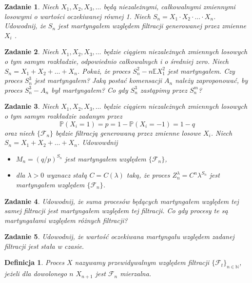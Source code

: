 \documentclass{mwart}
\newtheorem{df}{Definicja}
\newtheorem{zd}{Zadanie}
\begin{document}
\begin{zd}
Niech $X_1, X_2, X_3, \dots$ będą niezależnymi, całkowalnymi zmiennymi losowymi o wartości oczekiwanej równej 1. Niech $S_n = X_1\cdot X_2\cdot \dots \cdot X_n$. Udowodnij, że $S_n$ jest martyngałem względem filtracji generowanej przez zmienne $X_i$ .
\end{zd}

\begin{zd}
Niech $X_1, X_2, X_3, \dots$ będzie ciągiem niezależnych zmiennych losowych o tym samym rozkładzie, odpowiednio całkowalnych i o średniej zero. Niech $S_n = X_1+X_2+\dots + X_n$. Pokaż, że proces $S_n^2 - n\mathbb{E}X_1^2$  jest martyngałem. Czy proces $S_n^3$ jest martyngałem? Jaką postać komensacji $A_n$ należy zaproponować, by proces $S_n^3-A_n$ był martyngałem? Co gdy $S_n^3$ zastąpimy przez $S_n^m$?
\end{zd}

\begin{zd}
Niech $X_1, X_2, X_3, \dots$ będzie ciągiem niezależnych zmiennych losowych o tym samym rozkładzie zadanym przez
\begin{displaymath}
\mathbb{P}\left(X_i = 1\right) = p = 1-\mathbb{P}\left(X_i = -1\right) = 1-q
\end{displaymath}
oraz niech $\{\mathcal{F}_n\}$ będzie filtracją generowaną przez zmienne losowe $X_i$. Niech $S_n = X_1 + X_2 + \dots +X_n$. Udowowdnij
\begin{itemize}
\item $M_n = \left(q/p\right)^{S_n}$ jest martyngałem względem $\{\mathcal{F}_n\}$,
\item dla $\lambda >0 $ wyznacz stałą $C = C(\lambda)$ taką, że proces $Z_n^{\lambda} = C^n\lambda^{S_n}$ jest martyngałem względem $\{\mathcal{F}_n\}$.
\end{itemize}
\end{zd}


\begin{zd}
Udowodnij, że suma procesów będących martyngałem względem tej samej filtracji jest martyngałem względem tej filtracji. Co gdy procesy te są martyngałami względem różnych filtracji?
\end{zd}

\begin{zd}
Udowodnij, że wartość oczekiwana martyngału względem zadanej filtracji jest stała w czasie.
\end{zd}

\begin{df}
Proces $X$ nazywamy przewidywalnym względem filtracji $\{\mathcal{F}_t\}_{n\in \mathbb{N}}$, jeżeli dla dowolonego $n$ $X_{n+1}$ jest $\mathcal{F}_{n}$ mierzalna.
\end{df}
\end{document}
